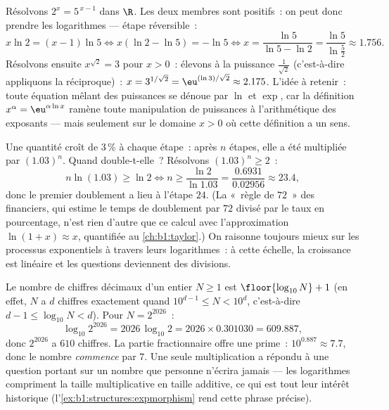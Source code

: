 \begin{example}\label{ex:b1:functions:expequations}
Résolvons $2^x = 5^{\,x-1}$ dans $\R$. Les deux membres sont
positifs~: on peut donc prendre les logarithmes --- étape réversible~:
\[
x\ln2 = (x - 1)\ln5
\iff x(\ln2 - \ln5) = -\ln5
\iff x = \frac{\ln5}{\ln5 - \ln2} = \frac{\ln 5}{\ln\frac52}
\approx 1.756 .
\]
Résolvons ensuite $x^{\sqrt2} = 3$ pour $x > 0$~: élevons à la
puissance $\frac1{\sqrt2}$ (c'est-à-dire appliquons la 
réciproque)~:
$x = 3^{1/\sqrt2} = \eu^{(\ln 3)/\sqrt2} \approx 2.175$. L'idée à
retenir~: toute équation mêlant des puissances se dénoue par $\ln$
et $\exp$, car la définition $x^\alpha = \eu^{\alpha\ln x}$
ramène toute manipulation de puissances à l'arithmétique des
exposants --- mais seulement sur le domaine $x > 0$ où cette
définition a un sens.
\end{example}

\begin{example}\label{ex:b1:functions:doubling}
Une quantité croît de $3\,\%$ à chaque étape~: après $n$ étapes, elle a
été multipliée par $(1.03)^n$. Quand double-t-elle~? Résolvons
$(1.03)^n \geq 2$~:
\[
n\ln(1.03) \geq \ln2
\iff n \geq \frac{\ln 2}{\ln 1.03}
= \frac{0.6931}{0.02956} \approx 23.4 ,
\]
donc le premier doublement a lieu à l'étape $24$. (La «~règle de
$72$~» des financiers, qui estime le temps de doublement par
$72$ divisé par le taux en pourcentage, n'est rien d'autre que ce
calcul avec l'approximation $\ln(1 + x) \approx x$, quantifiée au
\cref{ch:b1:taylor}.) On raisonne toujours mieux sur les processus
exponentiels à travers leurs logarithmes~: à cette échelle, la
croissance est linéaire et les questions deviennent des divisions.
\end{example}

\begin{example}\label{ex:b1:functions:digits}
Le nombre de chiffres décimaux d'un entier $N \geq 1$ est
$\floor{\log_{10} N} + 1$ (en effet, $N$ a $d$ chiffres exactement
quand $10^{d-1} \leq N < 10^d$, c'est-à-dire $d - 1 \leq \log_{10}N <
d$). Pour $N = 2^{2026}$~:
\[
\log_{10} 2^{2026} = 2026\,\log_{10}2
= 2026 \times 0.301030 = 609.887 ,
\]
donc $2^{2026}$ a $610$ chiffres. La partie fractionnaire offre une
prime~: $10^{0.887} \approx 7.7$, donc le nombre \emph{commence} par
$7$. Une seule multiplication a répondu à une question portant sur un
nombre que personne n'écrira jamais --- les logarithmes compriment la
taille multiplicative en taille additive, ce qui est tout leur intérêt
historique (l'\cref{ex:b1:structures:expmorphism} rend cette phrase
précise).
\end{example}

